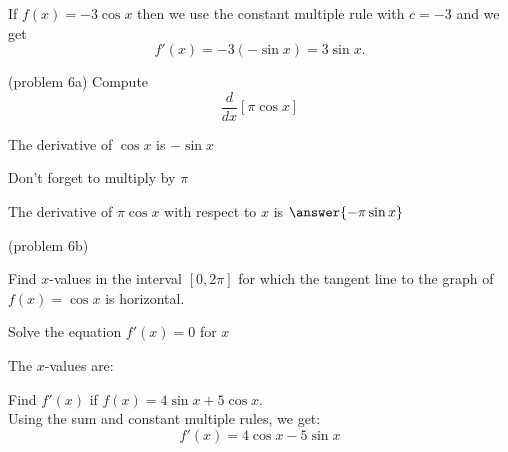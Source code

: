 \documentclass[handout]{ximera}
\begin{document}
\begin{example}[example 6]
 If $f(x) = -3\cos x$ then we use the constant multiple rule with $c = -3$ and we get 
\[
f'(x) = -3(-\sin x) = 3\sin x.
\]
\end{example}



\begin{problem}(problem 6a)
  Compute 
  \[
  \frac{d}{dx} \left[\pi\cos x\right]
  \]
  
    \begin{hint}
      The derivative of $\cos x$ is $-\sin x$
    \end{hint}
		\begin{hint}
		  Don't forget to multiply by $\pi$
		\end{hint}
		
		The derivative of $\pi\cos x$ with respect to $x$ is
		 $\answer{-\pi\sin x}$
	
\end{problem}



\begin{problem}(problem 6b)

Find $x$-values in the interval $[0, 2\pi]$ for which the tangent line to the 
graph of $f(x) = \cos x$ is horizontal.


\begin{hint}
Solve the equation $f'(x) = 0$ for $x$
\end{hint}

The $x$-values are:
\begin{multipleChoice}
\end{multipleChoice}

\end{problem}



\begin{foldable}
\end{foldable}


\begin{example}[example 7]
 Find $f'(x)$ if $f(x) = 4\sin x + 5\cos x.$ \\
 Using the sum and constant multiple rules, we get: 
\[
f'(x) = 4\cos x - 5\sin x
\]
\end{example}
\end{document}
